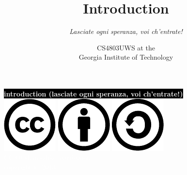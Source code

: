 \documentclass{beamer}
\title{\textbf{Introduction}}
\subtitle{{\it Lasciate ogni speranza, voi ch'entrate!}}
\date{}
\author{CS4803UWS at the\\
Georgia Institute of Technology
}
\begin{document}
{
%
\begin{frame}[plain]
\textcolor{white}{
%
\colorbox{black}{\textbf{introduction (lasciate ogni speranza, voi ch'entrate!)}}
}
\vspace{2.7in}
\\
\hfill\includegraphics[scale=.25]{images/cc-logo.pdf}
\includegraphics[scale=.25]{images/cc-new.pdf}
\includegraphics[scale=.25]{images/cc-share.pdf}
\textcolor{white}{
\\
\hfill \tiny{CC3.0 share-alike attribution}\\
}
\textcolor{white}{
\hfill \scriptsize{copyright \copyright\ 2013}\\
}
\end{frame}
}
\end{document}
